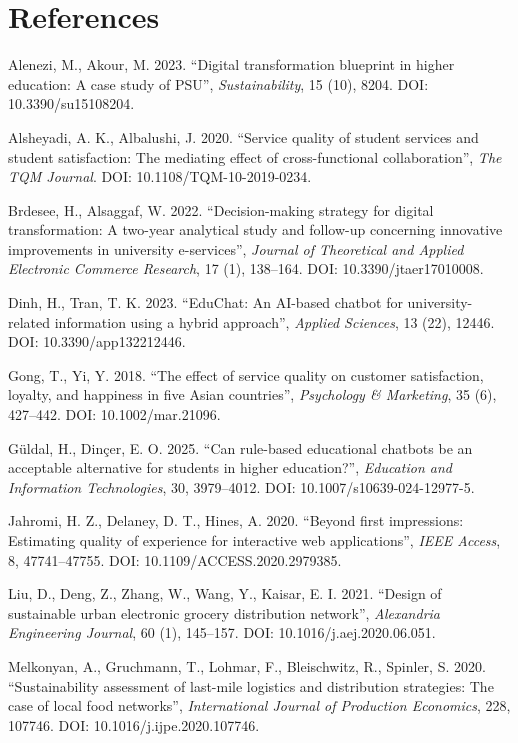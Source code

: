 \documentclass[11pt,a4paper]{article}
\begin{document}
\section{References}
\begin{enumerate}[label={[\arabic*]}]
    \item Alenezi, M., Akour, M. 2023. ``Digital transformation blueprint in higher education: A case study of PSU'', \textit{Sustainability}, 15 (10), 8204. DOI: 10.3390/su15108204.
    \item Alsheyadi, A. K., Albalushi, J. 2020. ``Service quality of student services and student satisfaction: The mediating effect of cross-functional collaboration'', \textit{The TQM Journal}. DOI: 10.1108/TQM-10-2019-0234.
    \item Brdesee, H., Alsaggaf, W. 2022. ``Decision-making strategy for digital transformation: A two-year analytical study and follow-up concerning innovative improvements in university e-services'', \textit{Journal of Theoretical and Applied Electronic Commerce Research}, 17 (1), 138--164. DOI: 10.3390/jtaer17010008.
    \item Dinh, H., Tran, T. K. 2023. ``EduChat: An AI-based chatbot for university-related information using a hybrid approach'', \textit{Applied Sciences}, 13 (22), 12446. DOI: 10.3390/app132212446.
    \item Gong, T., Yi, Y. 2018. ``The effect of service quality on customer satisfaction, loyalty, and happiness in five Asian countries'', \textit{Psychology \& Marketing}, 35 (6), 427--442. DOI: 10.1002/mar.21096.
    \item Güldal, H., Dinçer, E. O. 2025. ``Can rule-based educational chatbots be an acceptable alternative for students in higher education?'', \textit{Education and Information Technologies}, 30, 3979--4012. DOI: 10.1007/s10639-024-12977-5.
    \item Jahromi, H. Z., Delaney, D. T., Hines, A. 2020. ``Beyond first impressions: Estimating quality of experience for interactive web applications'', \textit{IEEE Access}, 8, 47741--47755. DOI: 10.1109/ACCESS.2020.2979385.
    \item Liu, D., Deng, Z., Zhang, W., Wang, Y., Kaisar, E. I. 2021. ``Design of sustainable urban electronic grocery distribution network'', \textit{Alexandria Engineering Journal}, 60 (1), 145--157. DOI: 10.1016/j.aej.2020.06.051.
    \item Melkonyan, A., Gruchmann, T., Lohmar, F., Bleischwitz, R., Spinler, S. 2020. ``Sustainability assessment of last-mile logistics and distribution strategies: The case of local food networks'', \textit{International Journal of Production Economics}, 228, 107746. DOI: 10.1016/j.ijpe.2020.107746.

\end{enumerate}
\end{document}
